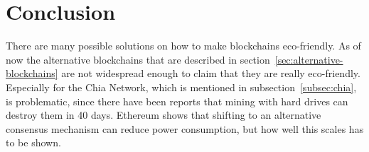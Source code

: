 
\section{Conclusion}\label{sec:conclusion}
There are many possible solutions on how to make blockchains eco-friendly.
As of now the alternative blockchains that are described in section\ \ref{sec:alternative-blockchains} are not widespread enough to claim that they are really eco-friendly.
Especially for the Chia Network, which is mentioned in subsection\ \ref{subsec:chia}, is problematic, since there have been reports that mining with hard drives can destroy them in 40 days.\cite{euronews-chia}
Ethereum shows that shifting to an alternative consensus mechanism can reduce power consumption, but how well this scales has to be shown.
